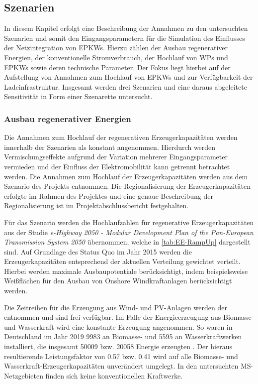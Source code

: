 \subsection{Szenarien}

In diesem Kapitel erfolgt eine Beschreibung der Annahmen zu den untersuchten Szenarien und somit den Eingangsparametern für die Simulation des Einflusses der Netzintegration von \glspl{EPKW}.
Hierzu zählen der Ausbau regenerativer Energien, der konventionelle Stromverbrauch, der Hochlauf von \glspl{WP} und \glspl{EPKW} sowie deren technische Parameter.
Der Fokus liegt hierbei auf der Aufstellung von Annahmen zum Hochlauf von \glspl{EPKW} und zur Verfügbarkeit der Ladeinfrastruktur.
Insgesamt werden drei Szenarien und eine daraus abgeleitete Sensitivität in Form einer Szenarette untersucht.


\subsubsection{Ausbau regenerativer Energien}

Die Annahmen zum Hochlauf der regenerativen Erzeugerkapazitäten werden innerhalb der Szenarien als konstant angenommen.
Hierdurch werden Vermischungseffekte aufgrund der Variation mehrerer Eingangsparameter vermieden und der Einfluss der Elektromobilität kann getrennt betrachtet werden.
Die Annahmen zum Hochlauf der Erzeugerkapazitäten werden aus dem Szenario \ego des  Projekts entnommen.
Die Regionalisierung der Erzeugerkapazitäten erfolgte im Rahmen des  Projektes und eine genaue Beschreibung der Regionalisierung ist im Projektabschlussbericht \cite{Mueller2019} festgehalten.\medskip

Für das Szenario \ego werden die Hochlaufzahlen für regenerative Erzeugerkapazitäten aus der Studie \textit{e-Highway 2050 - Modular Development Plan of the Pan-European Transmission System 2050} \cite{EEHPG2015} übernommen, welche in \autoref{tab:EE-RampUp} dargestellt sind.
Auf Grundlage des Status Quo im Jahr \num{2015} werden die Erzeugerkapazitäten entsprechend der aktuellen Verteilung gewichtet verteilt.
Hierbei werden maximale Ausbaupotentiale berücksichtigt, indem beispielsweise Weißflächen für den Ausbau von Onshore Windkraftanlagen berücksichtigt werden.



Die Zeitreihen für die Erzeugung aus Wind- und \gls{PV}-Anlagen werden der  \cite{OEP} entnommen und sind frei verfügbar.
Im Falle der Energieerzeugung aus Biomasse und Wasserkraft wird eine konstante Erzeugung angenommen.
So waren in Deutschland im Jahr \num{2019} \SI{9983}{\mw} an Biomasse- und \SI{5595}{\mw} an Wasserkraftwerken installiert, die insgesamt \SI{50009}{\gwh} bzw. \SI{20058}{\gwh} Energie erzeugten \cite{BMWi2020}.
Der hieraus resultierende Leistungsfaktor von \num{0.57} bzw. \num{0.41} wird auf alle Biomasse- und Wasserkraft-Erzeugerkapazitäten unverändert umgelegt.
In den untersuchten \gls{MS}-Netzgebieten finden sich keine konventionellen Kraftwerke.


